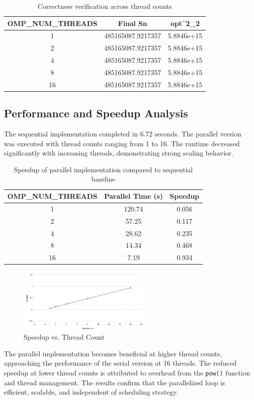 \documentclass[unicode,11pt,a4paper,oneside,numbers=endperiod,openany]{scrartcl}
\begin{document}
\begin{table}[h!]
\centering
\begin{tabular}{|c|c|c|}
\hline
\textbf{OMP\_NUM\_THREADS} & \textbf{Final Sn} & \textbf{opt\textasciicircum2\_2} \\
\hline
1 & 485165087.9217357 & 5.8846e+15 \\
2 & 485165087.9217357 & 5.8846e+15 \\
4 & 485165087.9217357 & 5.8846e+15 \\
8 & 485165087.9217357 & 5.8846e+15 \\
16 & 485165087.9217357 & 5.8846e+15 \\
\hline
\end{tabular}
\caption{Correctness verification across thread counts}
\end{table}

\subsection{Performance and Speedup Analysis}

The sequential implementation completed in 6.72 seconds. The parallel version was executed with thread counts ranging from 1 to 16. The runtime decreased significantly with increasing threads, demonstrating strong scaling behavior.

\begin{table}[h!]
\centering
\begin{tabular}{|c|c|c|}
\hline
\textbf{OMP\_NUM\_THREADS} & \textbf{Parallel Time (s)} & \textbf{Speedup} \\
\hline
1 & 120.74 & 0.056 \\
2 & 57.25 & 0.117 \\
4 & 28.62 & 0.235 \\
8 & 14.34 & 0.468 \\
16 & 7.19 & 0.934 \\
\hline
\end{tabular}
\caption{Speedup of parallel implementation compared to sequential baseline}
\end{table}

\begin{figure}[h!]
\centering
\includegraphics[width=0.6\textwidth]{./figures/Figure 9: speedup_plot.png}
\caption{Speedup vs. Thread Count}
\end{figure}

The parallel implementation becomes beneficial at higher thread counts, approaching the performance of the serial version at 16 threads. The reduced speedup at lower thread counts is attributed to overhead from the \texttt{pow()} function and thread management. The results confirm that the parallelized loop is efficient, scalable, and independent of scheduling strategy.
\end{document}
